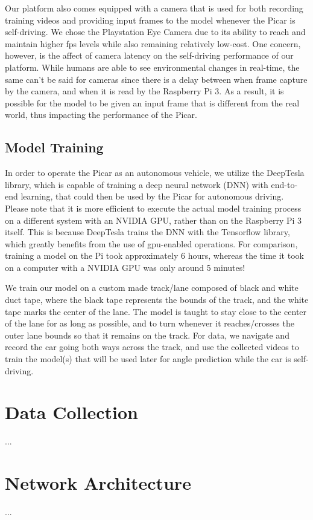 \documentclass[10pt, conference]{IEEEtran}
\begin{document}
Our platform also comes equipped with a camera that is used for both recording training videos and 
providing input frames to the model whenever the Picar is self-driving. We chose the Playstation Eye 
Camera due to its ability to reach and maintain higher fps levels while also remaining relatively 
low-cost. One concern, however, is the affect of camera latency on the self-driving performance of our 
platform. While humans are able to see environmental changes in real-time, the same can't be said for 
cameras since there is a delay between when frame capture by the camera, and when it is read by the 
Raspberry Pi 3. As a result, it is possible for the model to be given an input frame that is different 
from the real world, thus impacting the performance of the Picar.

\subsection{Model Training}
In order to operate the Picar as an autonomous vehicle, we utilize the DeepTesla library, which is 
capable of training a deep neural network (DNN) with end-to-end learning, that could then be used by the 
Picar for autonomous driving. Please note that it is more efficient to execute the actual model training 
process on a different system with an NVIDIA GPU, rather than on the Raspberry Pi 3 itself. This is 
because DeepTesla trains the DNN with the Tensorflow library, which greatly benefits from the use of 
gpu-enabled operations. For comparison, training a model on the Pi took approximately 6 hours, whereas 
the time it took on a computer with a NVIDIA GPU was only around 5 minutes! 

We train our model on a custom made track/lane composed of black and white duct tape, where the black 
tape represents the bounds of the track, and the white tape marks the center of the lane. The model is 
taught to stay close to the center of the lane for as long as possible, and to turn whenever it 
reaches/crosses the outer lane bounds so that it remains on the track. For data, we navigate and record 
the car going both ways across the track, and use the collected videos to train the model(s) that will 
be used later for angle prediction while the car is self-driving.

\section{Data Collection}
...
\section{Network Architecture}
...
\end{document}
